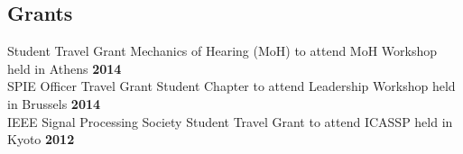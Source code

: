 \documentclass[line]{resume}
\begin{document}
{\begin{resume}
    \section{\mysidestyle Grants}
    \vspace{1mm}
    Student Travel Grant Mechanics of Hearing (MoH) to attend MoH Workshop held in Athens \hfill \textbf{2014} \vspace{1mm}\\%
    SPIE Officer Travel Grant Student Chapter to attend Leadership Workshop held in Brussels \hfill \textbf{2014} \vspace{1mm}\\%
    IEEE Signal Processing Society Student Travel Grant to attend ICASSP held in Kyoto \hfill \textbf{2012}
    \vspace{-1.5mm}

\end{resume}}
\end{document}
